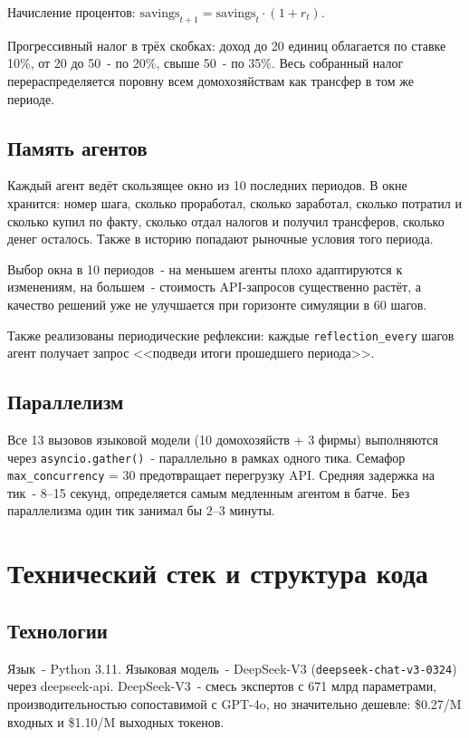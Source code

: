 \documentclass[12pt, a4paper]{article}
\begin{document}
Начисление процентов: $\text{savings}_{t+1} = \text{savings}_t \cdot (1 + r_t)$.

Прогрессивный налог в трёх скобках: доход до 20 единиц облагается по ставке 10\%, от 20 до 50~- по 20\%, свыше 50~- по 35\%. Весь собранный налог перераспределяется поровну всем домохозяйствам как трансфер в том же периоде.

\subsection{Память агентов}

Каждый агент ведёт скользящее окно из 10 последних периодов. В окне хранится: номер шага, сколько проработал, сколько заработал, сколько потратил и сколько купил по факту, сколько отдал налогов и получил трансферов, сколько денег осталось. Также в историю попадают рыночные условия того периода.

Выбор окна в 10 периодов~- на меньшем агенты плохо адаптируются к изменениям, на большем~- стоимость API-запросов существенно растёт, а качество решений уже не улучшается при горизонте симуляции в 60 шагов.

Также реализованы периодические рефлексии: каждые \texttt{reflection\_every} шагов агент получает запрос <<подведи итоги прошедшего периода>>.

\subsection{Параллелизм}

Все 13 вызовов языковой модели (10 домохозяйств + 3 фирмы) выполняются через \texttt{asyncio.gather()}~- параллельно в рамках одного тика. Семафор \texttt{max\_concurrency} = 30 предотвращает перегрузку API. Средняя задержка на тик~- 8--15 секунд, определяется самым медленным агентом в батче. Без параллелизма один тик занимал бы 2--3 минуты.

\section{Технический стек и структура кода}

\subsection{Технологии}

Язык~- Python 3.11. Языковая модель~- DeepSeek-V3 (\texttt{deepseek-chat-v3-0324}) через deepseek-api. DeepSeek-V3~- смесь экспертов с 671 млрд параметрами, производительностью сопоставимой с GPT-4o, но значительно дешевле: \$0.27/M входных и \$1.10/M выходных токенов.
\end{document}

